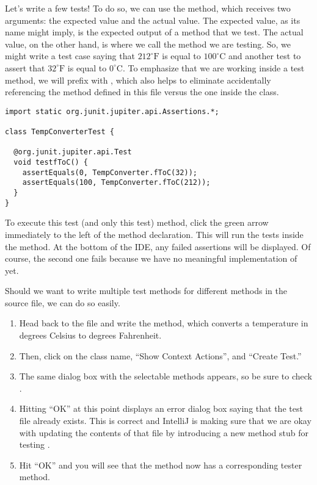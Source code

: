   Let's write a few tests! 
  To do so, we can use the  method, which receives two arguments: the expected value and the actual value. 
  The expected value, as its name might imply, is the expected output of a method that we test. 
  The actual value, on the other hand, is where we call the method we are testing. 
  So, we might write a test case saying that $212^{\circ}\text{F}$ is equal to $100^{\circ}\text{C}$ and another test to assert that $32^{\circ}\text{F}$ is equal to $0^{\circ}\text{C}$. 
  To emphasize that we are working inside a test method, we will prefix  with , which also helps to eliminate accidentally referencing the  method defined in this file versus the one inside the  class.

\begin{lstlisting}[language=MyJava]
import static org.junit.jupiter.api.Assertions.*;

class TempConverterTest {

  @org.junit.jupiter.api.Test
  void testfToC() {
    assertEquals(0, TempConverter.fToC(32));
    assertEquals(100, TempConverter.fToC(212));
  }
}
\end{lstlisting}

To execute this test (and only this test) method, click the green arrow immediately to the left of the method declaration. 
This will run the tests inside the method.
At the bottom of the IDE, any failed assertions will be displayed.
Of course, the second one fails because we have no meaningful implementation of  yet. 

Should we want to write multiple test methods for different methods in the source file, we can do so easily. 
\begin{enumerate}[label=(\arabic*)]
  \item Head back to the  file and write the  method, which converts a temperature in degrees Celsius to degrees Fahrenheit. 
  \item Then, click on the class name, ``Show Context Actions'', and ``Create Test.'' 
  \item The same dialog box with the selectable methods appears, so be sure to check . 
  \item Hitting ``OK'' at this point displays an error dialog box saying that the test file already exists. This is correct and IntelliJ is making sure that we are okay with updating the contents of that file by introducing a new method stub for testing . 
  \item Hit ``OK'' and you will see that the  method now has a corresponding tester method. 
\end{enumerate}

